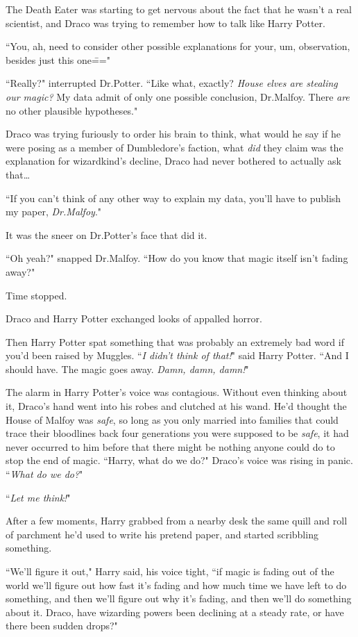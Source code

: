The Death Eater was starting to get nervous about the fact that he wasn't a real scientist, and Draco was trying to remember how to talk like Harry Potter.

``You, ah, need to consider other possible explanations for your, um, observation, besides just this one\==="

``Really?" interrupted Dr.\?Potter. ``Like what, exactly? \emph{House elves are stealing our magic?} My data admit of only one possible conclusion, Dr.\?Malfoy. There \emph{are} no other plausible hypotheses."

Draco was trying furiously to order his brain to think, what would he say if he were posing as a member of Dumbledore's faction, what \emph{did} they claim was the explanation for wizardkind's decline, Draco had never bothered to actually ask that{\ldots}

``If you can't think of any other way to explain my data, you'll have to publish my paper, \emph{Dr.\?Malfoy}."

It was the sneer on Dr.\?Potter's face that did it.

``Oh yeah?" snapped Dr.\?Malfoy. ``How do you know that magic itself isn't fading away?"

Time stopped.

Draco and Harry Potter exchanged looks of appalled horror.

Then Harry Potter spat something that was probably an extremely bad word if you'd been raised by Muggles. ``\emph{I didn't think of that!}" said Harry Potter. ``And I should have. The magic goes away. \emph{Damn, damn, damn!}"

The alarm in Harry Potter's voice was contagious. Without even thinking about it, Draco's hand went into his robes and clutched at his wand. He'd thought the House of Malfoy was \emph{safe}, so long as you only married into families that could trace their bloodlines back four generations you were supposed to be \emph{safe}, it had never occurred to him before that there might be nothing anyone could do to stop the end of magic. ``Harry, what do we do?" Draco's voice was rising in panic. ``\emph{What do we do?}"

``\emph{Let me think!}"

After a few moments, Harry grabbed from a nearby desk the same quill and roll of parchment he'd used to write his pretend paper, and started scribbling something.

``We'll figure it out," Harry said, his voice tight, ``if magic is fading out of the world we'll figure out how fast it's fading and how much time we have left to do something, and then we'll figure out why it's fading, and then we'll do something about it. Draco, have wizarding powers been declining at a steady rate, or have there been sudden drops?"

